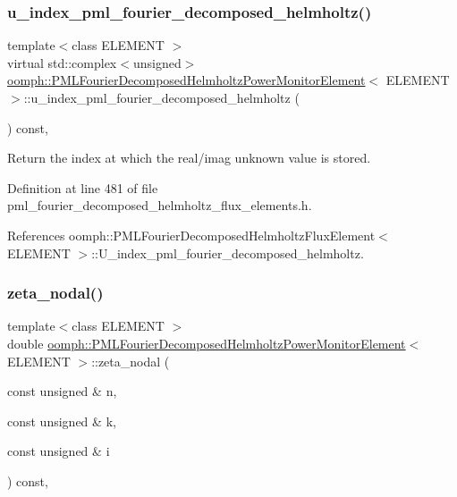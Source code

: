 \subsubsection{\texorpdfstring{u\+\_\+index\+\_\+pml\+\_\+fourier\+\_\+decomposed\+\_\+helmholtz()}{u\_index\_pml\_fourier\_decomposed\_helmholtz()}}
{\footnotesize\ttfamily template$<$class E\+L\+E\+M\+E\+NT $>$ \\
virtual std\+::complex$<$unsigned$>$ \hyperlink{classoomph_1_1PMLFourierDecomposedHelmholtzPowerMonitorElement}{oomph\+::\+P\+M\+L\+Fourier\+Decomposed\+Helmholtz\+Power\+Monitor\+Element}$<$ E\+L\+E\+M\+E\+NT $>$\+::u\+\_\+index\+\_\+pml\+\_\+fourier\+\_\+decomposed\+\_\+helmholtz (\begin{DoxyParamCaption}{ }\end{DoxyParamCaption}) const\hspace{0.3cm}{\ttfamily [inline]}, {\ttfamily [virtual]}}



Return the index at which the real/imag unknown value is stored. 



Definition at line 481 of file pml\+\_\+fourier\+\_\+decomposed\+\_\+helmholtz\+\_\+flux\+\_\+elements.\+h.



References oomph\+::\+P\+M\+L\+Fourier\+Decomposed\+Helmholtz\+Flux\+Element$<$ E\+L\+E\+M\+E\+N\+T $>$\+::\+U\+\_\+index\+\_\+pml\+\_\+fourier\+\_\+decomposed\+\_\+helmholtz.

\mbox{\label{classoomph_1_1PMLFourierDecomposedHelmholtzPowerMonitorElement_a4618f13a3a0d53cc95a2f4951f7e40e9}} 
\subsubsection{\texorpdfstring{zeta\+\_\+nodal()}{zeta\_nodal()}}
{\footnotesize\ttfamily template$<$class E\+L\+E\+M\+E\+NT $>$ \\
double \hyperlink{classoomph_1_1PMLFourierDecomposedHelmholtzPowerMonitorElement}{oomph\+::\+P\+M\+L\+Fourier\+Decomposed\+Helmholtz\+Power\+Monitor\+Element}$<$ E\+L\+E\+M\+E\+NT $>$\+::zeta\+\_\+nodal (\begin{DoxyParamCaption}\item[{const unsigned \&}]{n,  }\item[{const unsigned \&}]{k,  }\item[{const unsigned \&}]{i }\end{DoxyParamCaption}) const\hspace{0.3cm}{\ttfamily [inline]}, {\ttfamily [virtual]}}



